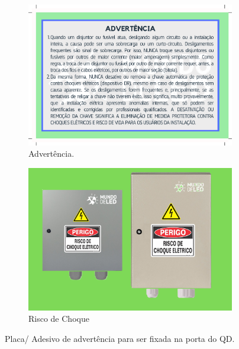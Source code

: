    

\begin{figure}
\centering
\begin{subfigure}{0.4\textwidth}
	\includegraphics[width=\textwidth]{image/EtiqAdvQD.pdf}
	\caption{Advertência.}
	\label{fig:advQD_1}
\end{subfigure}
\hfill
\begin{subfigure}{0.4\textwidth}
    \includegraphics[width=\textwidth]{image/2.png}
    \caption{Risco de Choque}
    \label{fig:advQD_2}
\end{subfigure}
\caption{Placa/ Adesivo de advertência para ser fixada na porta do QD.}
\label{fig:advQD}
\end{figure}
